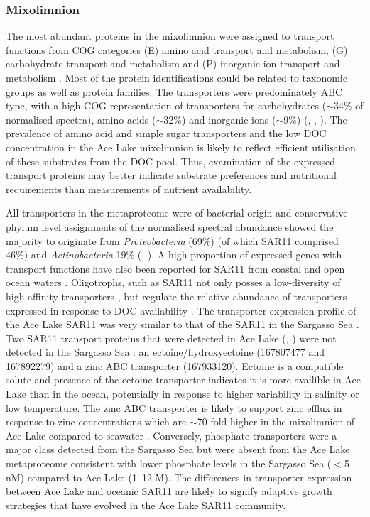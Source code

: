 \subsubsection{Mixolimnion}
The most abundant proteins in the mixolimnion were assigned to transport functions from COG categories (E) amino acid transport and metabolism, (G) carbohydrate transport and metabolism and (P) inorganic ion transport and metabolism . 
Most of the protein identifications could be related to taxonomic groups as well as protein families.
The transporters were predominately \ac{ABC} type, with a high \ac{COG} representation of transporters for carbohydrates ($\sim$34\% of normalised spectra), amino acids ($\sim$32\%) and inorganic ions ($\sim$9\%) (, ,  ).
The prevalence of amino acid and simple sugar transporters and the low \ac{DOC} concentration in the Ace Lake mixolimnion  is likely to reflect efficient utilisation of these substrates from the \ac{DOC} pool.
Thus, examination of the expressed transport proteins may better indicate substrate preferences and nutritional requirements than measurements of nutrient availability. 

All transporters in the metaproteome were of bacterial origin and conservative phylum level assignments of the normalised spectral abundance showed the majority to originate from \emph{Proteobacteria} (69\%) (of which SAR11 comprised 46\%) and \emph{Actinobacteria} 19\% (, ). 
A high proportion of expressed genes with transport functions have also been reported for SAR11 from coastal \cite{Poretsky2010} and open ocean waters \cite{Sowell2009, Morris2010}. 
Oligotrophs, such as SAR11 not only posses a low-diversity of high-affinity transporters \cite{Lauro2009}, but regulate the relative abundance of transporters expressed in response to \ac{DOC} availability \cite{Poretsky2010}. 
The transporter expression profile of the Ace Lake SAR11 was very similar to that of the SAR11 in the Sargasso Sea \cite{Sowell2009}.
Two SAR11 transport proteins that were detected in Ace Lake (, ) were not detected in the Sargasso Sea \cite{Sowell2009}: an ectoine/hydroxyectoine (167807477 and 167892279) and a zinc \ac{ABC} transporter (167933120). 
Ectoine is a compatible solute and presence of the ectoine transporter indicates it is more availible in Ace Lake than in the ocean, potentially in response to higher variability in salinity or low temperature.
The zinc \ac{ABC} transporter is likely to support zinc efflux in response to zinc concentrations which are $\sim$70-fold higher in the mixolimnion of Ace Lake compared to seawater \cite{Rankin1999}. 
Conversely, phosphate transporters were a major class detected from the Sargasso Sea \cite{Sowell2009} but were absent from the Ace Lake metaproteome consistent with lower phosphate levels in the Sargasso Sea ($<$5 nM) compared to Ace Lake (1--12 \textmu{}M). 
The differences in transporter expression between Ace Lake and oceanic SAR11 are likely to signify adaptive growth strategies that have evolved in the Ace Lake SAR11 community.

